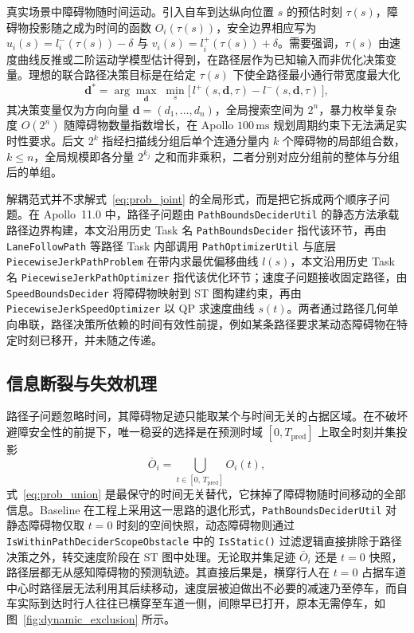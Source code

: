 \documentclass[a4paper,zihao=5]{ctexart}
\theoremstyle{definition}
\begin{document}
真实场景中障碍物随时间运动。引入自车到达纵向位置 $s$ 的预估时刻 $\tau(s)$，障碍物投影随之成为时间的函数 $O_i(\tau(s))$，安全边界相应写为 $u_i(s) = l_i^{-}(\tau(s)) - \delta$ 与 $v_i(s) = l_i^{+}(\tau(s)) + \delta$。需要强调，$\tau(s)$ 由速度曲线反推或二阶运动学模型估计得到，在路径层作为已知输入而非优化决策变量。理想的联合路径决策目标是在给定 $\tau(s)$ 下使全路径最小通行带宽度最大化
\begin{equation}
    \mathbf{d}^{*} = \arg\max_{\mathbf{d}} \;\min_{s} \big[\,l^{+}(s, \mathbf{d}, \tau) - l^{-}(s, \mathbf{d}, \tau)\,\big],
    \label{eq:prob_joint}
\end{equation}
其决策变量仅为方向向量 $\mathbf{d} = (d_1, \ldots, d_n)$，全局搜索空间为 $2^n$，暴力枚举复杂度 $O(2^n)$ 随障碍物数量指数增长，在 Apollo $100\,\mathrm{ms}$ 规划周期约束下无法满足实时性要求。后文 $2^k$ 指经扫描线分组后单个连通分量内 $k$ 个障碍物的局部组合数，$k \leq n$，全局规模即各分量 $2^{k_j}$ 之和而非乘积，二者分别对应分组前的整体与分组后的单组。

{\sloppy 解耦范式并不求解式~\eqref{eq:prob_joint} 的全局形式，而是把它拆成两个顺序子问题。在 Apollo~11.0 中，路径子问题由 \texttt{PathBoundsDeciderUtil} 的静态方法承载路径边界构建，本文沿用历史 Task 名 \texttt{PathBoundsDecider} 指代该环节，再由 \texttt{LaneFollowPath} 等路径 Task 内部调用 \texttt{PathOptimizerUtil} 与底层 \texttt{PiecewiseJerkPathProblem} 在带内求最优偏移曲线 $l(s)$，本文沿用历史 Task 名 \texttt{PiecewiseJerkPathOptimizer} 指代该优化环节；速度子问题接收固定路径，由 \texttt{SpeedBoundsDecider} 将障碍物映射到 ST 图构建约束，再由 \texttt{PiecewiseJerkSpeedOptimizer} 以 QP 求速度曲线 $s(t)$。两者通过路径几何单向串联，路径决策所依赖的时间有效性前提，例如某条路径要求某动态障碍物在特定时刻已移开，并未随之传递。\par}

\subsection{信息断裂与失效机理}
\label{subsec:union_projection}

路径子问题忽略时间，其障碍物足迹只能取某个与时间无关的占据区域。在不破坏避障安全性的前提下，唯一稳妥的选择是在预测时域 $[0, T_{\text{pred}}]$ 上取全时刻并集投影
\begin{equation}
    \bar{O}_i = \bigcup_{t \in [0,\,T_{\text{pred}}]} O_i(t),
    \label{eq:prob_union}
\end{equation}
式~\eqref{eq:prob_union} 是最保守的时间无关替代，它抹掉了障碍物随时间移动的全部信息。Baseline 在工程上采用这一思路的退化形式，\texttt{PathBoundsDeciderUtil} 对静态障碍物仅取 $t{=}0$ 时刻的空间快照，动态障碍物则通过 \texttt{IsWithinPathDeciderScopeObstacle} 中的 \texttt{IsStatic()} 过滤逻辑直接排除于路径决策之外，转交速度阶段在 ST 图中处理。无论取并集足迹 $\bar{O}_i$ 还是 $t{=}0$ 快照，路径层都无从感知障碍物的预测轨迹。其直接后果是，横穿行人在 $t{=}0$ 占据车道中心时路径层无法利用其后续移动，速度层被迫做出不必要的减速乃至停车，而自车实际到达时行人往往已横穿至车道一侧，间隙早已打开，原本无需停车，如图~\ref{fig:dynamic_exclusion} 所示。
\end{document}
